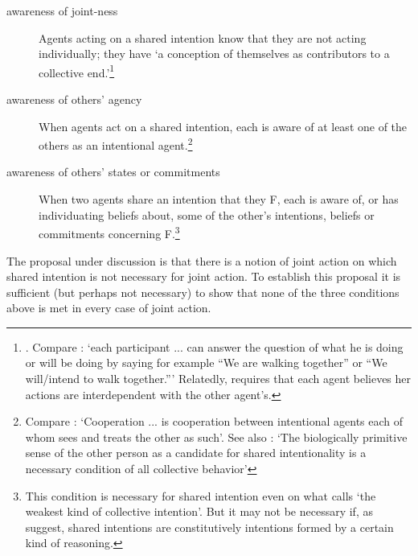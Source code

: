 \documentclass[12pt,a4paper]{extarticle}
\begin{document}
\begin{description}
\label{shared_intention_conditions}

\item[awareness of joint-ness] Agents acting on a shared intention know that they are not acting individually; they have `a conception of themselves as contributors to a collective end.'\footnote{
	\citet[p.\ 10]{Kutz:2000si}.  Compare \citet[p.\ 361]{Roth:2004ki}: `each participant ... can answer the question of what he is doing or will be doing by saying for example ``We are walking together'' or ``We will/intend to walk together.''' 
Relatedly, \citet[p. 56]{miller_social_2001} requires that each agent believes her actions are interdependent with the other agent's.
}

\item[awareness of others' agency]  When agents act on a shared intention, each is aware of at least one of the others as an intentional agent.\footnote{
	Compare \citet[p.\ 333]{Bratman:1992mi}: `Cooperation ... is cooperation between intentional agents each of whom sees and treats the other as such'.  See also \citet[p.\ 105]{Searle:1990em}: `The biologically primitive sense of the other person as a candidate for shared intentionality is a necessary condition of all collective behavior' 
}

\item[awareness of others' states or commitments] When two agents share an intention that they F, each is aware of, or has individuating beliefs about, some of the other's intentions, beliefs or commitments concerning F.\footnote{
This condition is necessary for shared intention even on what \citet[p.\ 40]{tuomela_collective_2000} calls `the weakest kind of collective intention'.  But it may not be necessary if, as \citet{Gold:2007zd} suggest, shared intentions are constitutively intentions formed by a certain kind of reasoning.
}

\end{description}
The proposal under discussion is that there is a notion of joint action on which shared intention is not necessary for joint action.
To establish this proposal it is sufficient (but perhaps not necessary) to show that none of the three conditions above is met in every case of joint action.
\end{document}

